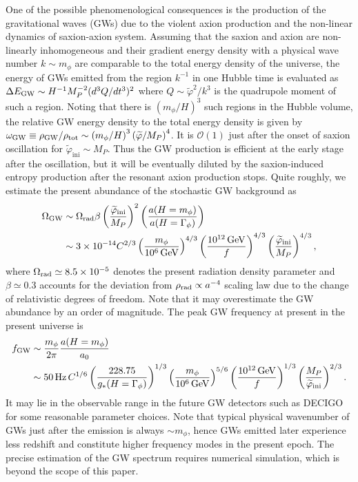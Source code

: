 \documentclass[12pt, a4paper]{article}
\begin{document}
One of the possible phenomenological consequences is the production of the gravitational waves (GWs) due to the violent axion production
and the non-linear dynamics of saxion-axion system.
Assuming that the saxion and axion are non-linearly inhomogeneous and their gradient energy density with a physical wave number $k\sim m_\phi$
are comparable to the total energy density of the universe,
the energy of GWs emitted from the region $k^{-1}$ in one Hubble time is evaluated as $\Delta E_{\rm GW} \sim H^{-1}M_P^{-2}(d^3 Q/dt^3)^2$ where $Q\sim \widetilde\varphi^2/k^3$ is the quadrupole moment of such a region.
Noting that there is $(m_\phi/H)^3$ such regions in the Hubble volume,
the relative GW energy density to the total energy density is given by 
$\omega_{\rm GW}\equiv \rho_{\rm GW} / \rho_{\rm tot} 
\sim \left(m_\phi/H\right)^3 \left(\widetilde{\varphi}/M_P\right)^4$.
It is $\mathcal O(1)$ just after the onset of saxion oscillation for $\widetilde{\varphi}_\mathrm{ini} \sim M_P$.
Thus the GW production is efficient at the early stage after the oscillation,
but it will be eventually diluted by the saxion-induced entropy production after the resonant axion production stops.
Quite roughly, we estimate the present abundance of the stochastic GW background as
\begin{align}
	\Omega_{\rm GW} &\sim \Omega_{\rm rad}\beta
	\left( \frac{\widetilde{\varphi}_\mathrm{ini}}{M_P}\right)^{2}
	\left( \frac{a(H=m_\phi)}{a(H=\Gamma_\phi)} \right) \nonumber \\
	&\sim 3\times 10^{-14} C^{2/3} \left( \frac{m_\phi}{10^6\,{\rm GeV}} \right)^{4/3}
	\left( \frac{10^{12}\,{\rm GeV}}{f} \right)^{4/3}
	\left( \frac{\widetilde{\varphi}_\mathrm{ini}}{M_P}\right)^{4/3},
\end{align}
where $\Omega_{\rm rad} \simeq 8.5\times 10^{-5}$ denotes the present radiation density parameter
and $\beta \simeq 0.3$ accounts for the deviation from $\rho_{\rm rad} \propto a^{-4}$ scaling law due to the change of relativistic degrees of freedom.
Note that it may overestimate the GW abundance by an order of magnitude.
The peak GW frequency at present in the present universe is
\begin{align}
	f_{\rm GW} &\sim \frac{m_\phi}{2\pi}\frac{a(H=m_\phi)}{a_0} \nonumber \\
	&\sim 50\,{\rm Hz}\,C^{1/6}\left( \frac{228.75}{g_*(H=\Gamma_\phi)} \right)^{1/3}
	\left( \frac{m_\phi}{10^6\,{\rm GeV}} \right)^{5/6}
	\left( \frac{10^{12}\,{\rm GeV}}{f} \right)^{1/3}
	\left( \frac{M_P}{\widetilde{\varphi}_\mathrm{ini}}\right)^{2/3}.
\end{align}
It may lie in the observable range in the future GW detectors such as DECIGO~\cite{Seto:2001qf}
for some reasonable parameter choices.
Note that typical physical wavenumber of GWs just after the emission is always $\sim m_\phi$,
hence GWs emitted later experience less redshift and constitute higher frequency modes in the present epoch.
The precise estimation of the GW spectrum requires numerical simulation, which is beyond the scope of this paper.
\end{document}

